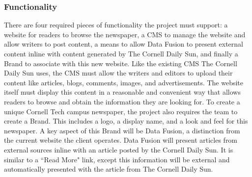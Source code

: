 \documentclass[12pt]{article} %
\begin{document}
\subsubsection{Functionality}
                   
There are four required pieces of functionality the project must support: a website for readers to browse the newspaper, a CMS to manage the website and allow writers to post content, a means to allow Data Fusion to present external content inline with content generated by The Cornell Daily Sun, and finally a Brand to associate with this new website. Like the existing CMS The Cornell Daily Sun uses, the CMS must allow the writers and editors to upload their content like articles, blogs, comments, images, and advertisements. The website itself must display this content in a reasonable and convenient way that allows readers to browse and obtain the information they are looking for. To create a unique Cornell Tech campus newspaper, the project also requires the team to create a Brand. This includes a logo, a display name, and a look and feel for this newspaper. A key aspect of this Brand will be Data Fusion, a distinction from the current website the client operates. Data Fusion will present articles from external sources inline with an article posted by the Cornell Daily Sun. It is similar to a ``Read More" link, except this information will be external and automatically presented with the article from The Cornell Daily Sun.
                   
\end{document}
